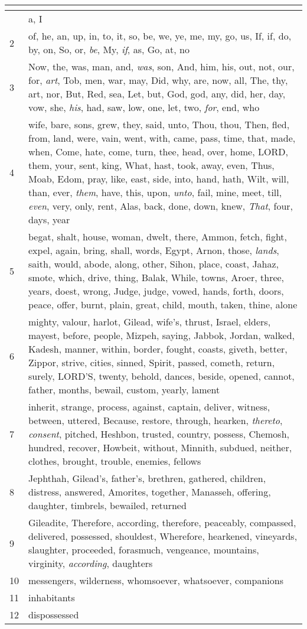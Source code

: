 \begin{center}
\begin{longtable}{l|p{3.75in}}
\hline \multicolumn{2}{c}{{ }} \\ \hline
\endfoot 
1 & a, I\\ \hline 
2 & of, he, an, up, in, to, it, so, be, we, ye, me, my, go, us, If, if, do, by, on, So, or, \emph{be}, My, \emph{if}, as, Go, at, no\\ \hline 
3 & Now, the, was, man, and, \emph{was}, son, And, him, his, out, not, our, for, \emph{art}, Tob, men, war, may, Did, why, are, now, all, The, thy, art, nor, But, Red, sea, Let, but, God, god, any, did, her, day, vow, she, \emph{his}, had, saw, low, one, let, two, \emph{for}, end, who\\ \hline 
4 & wife, bare, sons, grew, they, said, unto, Thou, thou, Then, fled, from, land, were, vain, went, with, came, pass, time, that, made, when, Come, hate, come, turn, thee, head, over, home, LORD, them, your, sent, king, What, hast, took, away, even, Thus, Moab, Edom, pray, like, east, side, into, hand, hath, Wilt, will, than, ever, \emph{them}, have, this, upon, \emph{unto}, fail, mine, meet, till, \emph{even}, very, only, rent, Alas, back, done, down, knew, \emph{That}, four, days, year\\ \hline 
5 & begat, shalt, house, woman, dwelt, there, Ammon, fetch, fight, expel, again, bring, shall, words, Egypt, Arnon, those, \emph{lands}, saith, would, abode, along, other, Sihon, place, coast, Jahaz, smote, which, drive, thing, Balak, While, towns, Aroer, three, years, doest, wrong, Judge, judge, vowed, hands, forth, doors, peace, offer, burnt, plain, great, child, mouth, taken, thine, alone\\ \hline 
6 & mighty, valour, harlot, Gilead, wife's, thrust, Israel, elders, mayest, before, people, Mizpeh, saying, Jabbok, Jordan, walked, Kadesh, manner, within, border, fought, coasts, giveth, better, Zippor, strive, cities, sinned, Spirit, passed, cometh, return, surely, LORD'S, twenty, behold, dances, beside, opened, cannot, father, months, bewail, custom, yearly, lament\\ \hline 
7 & inherit, strange, process, against, captain, deliver, witness, between, uttered, Because, restore, through, hearken, \emph{thereto}, \emph{consent}, pitched, Heshbon, trusted, country, possess, Chemosh, hundred, recover, Howbeit, without, Minnith, subdued, neither, clothes, brought, trouble, enemies, fellows\\ \hline 
8 & Jephthah, Gilead's, father's, brethren, gathered, children, distress, answered, Amorites, together, Manasseh, offering, daughter, timbrels, bewailed, returned\\ \hline 
9 & Gileadite, Therefore, according, therefore, peaceably, compassed, delivered, possessed, shouldest, Wherefore, hearkened, vineyards, slaughter, proceeded, forasmuch, vengeance, mountains, virginity, \emph{according}, daughters\\ \hline 
10 & messengers, wilderness, whomsoever, whatsoever, companions\\ \hline 
11 & inhabitants\\ \hline 
12 & dispossessed\\ \hline 
\end{longtable}
\end{center}






